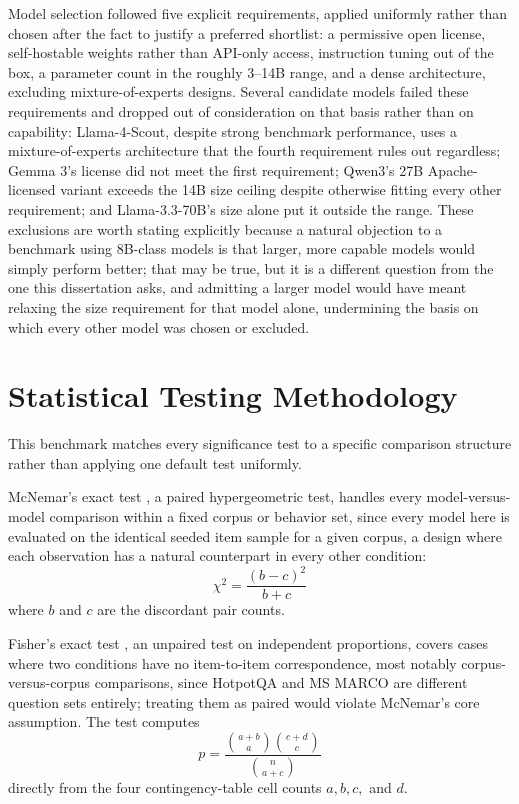 Model selection followed five explicit requirements, applied uniformly
rather than chosen after the fact to justify a preferred shortlist: a
permissive open license, self-hostable weights rather than API-only
access, instruction tuning out of the box, a parameter count in the
roughly 3--14B range, and a dense architecture, excluding
mixture-of-experts designs. Several candidate models failed these
requirements and dropped out of consideration on that basis rather than
on capability: Llama-4-Scout, despite strong benchmark performance, uses
a mixture-of-experts architecture that the fourth requirement rules out
regardless; Gemma 3's license did not meet the first requirement;
Qwen3's 27B Apache-licensed variant exceeds the 14B size ceiling despite
otherwise fitting every other requirement; and Llama-3.3-70B's size
alone put it outside the range. These exclusions are worth stating
explicitly because a natural objection to a benchmark using 8B-class
models is that larger, more capable models would simply perform better;
that may be true, but it is a different question from the one this
dissertation asks, and admitting a larger model would have meant
relaxing the size requirement for that model alone, undermining the
basis on which every other model was chosen or excluded.

\section{Statistical Testing Methodology}

This benchmark matches every significance test to a specific comparison
structure rather than applying one default test uniformly. 

McNemar's exact test \citep{mcnemar1947note}, a paired hypergeometric test,
handles every model-versus-model comparison within a fixed corpus or
behavior set, since every model here is evaluated on the identical
seeded item sample for a given corpus, a design where each observation
has a natural counterpart in every other condition:
$$
\chi^2 = \frac{(b-c)^2}{b+c}
$$
where $b$ and $c$ are the discordant pair counts. 

Fisher's exact test \citep{fisher1922interpretation}, an
unpaired test on independent proportions, covers cases where two
conditions have no item-to-item correspondence, most notably
corpus-versus-corpus comparisons, since HotpotQA and MS MARCO are
different question sets entirely; treating them as paired would violate
McNemar's core assumption. The test computes
$$
p = \frac{\binom{a+b}{a}\binom{c+d}{c}}{\binom{n}{a+c}}
$$ 
directly from the four contingency-table cell counts $a, b, c,$ and $d$.

